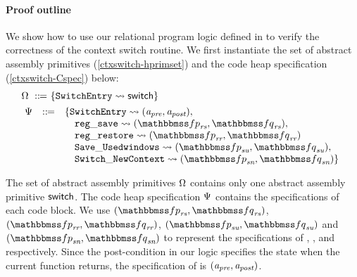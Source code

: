 \paragraph{\textbf{Proof outline}} We show how to use
our relational program logic defined in
\Fig{\ref{fig:Selected Inference Rules for Refinement Verification}}
to verify the correctness of the context switch routine.
We first instantiate the set of
abstract assembly primitives (\ref{ctxswitch-hprimset})
and the code heap specification (\ref{ctxswitch-Cspec})
below:
\begin{align}
    & \hprimset \ \define \ \{ \SwitchEntry \leadsto
        \primsw \}
        \label{ctxswitch-hprimset} \\
    & \!\begin{array}{lcl}
        \Cspec & \define &
        \{ \SwitchEntry \leadsto (\Apre, \Apost), \\
        & & \quad
        \regsave \leadsto
        (\relspecpre_{\textit{rs}}, \relspecpost_{\textit{rs}}),\\
        & & \quad
        \regrestore \leadsto
        (\relspecpre_{\textit{rr}}, \relspecpost_{\textit{rr}}) \\
        & & \quad
        \SaveUsedWin{} \leadsto (\relspecpre_{\textit{su}}, \relspecpost_{\textit{su}}), \\
        & & \quad
        \SwitchNewTask{} \leadsto (\relspecpre_{\textit{sn}}, \relspecpost_{\textit{sn}})
        \}
        \label{ctxswitch-Cspec}
    \end{array}
\end{align}

The set of abstract assembly primitives $\Omega$
contains only one abstract assembly primitive $\mathsf{switch}$.
The code heap specification $\Psi{}$
contains the specifications of each code block.
We use
$(\relspecpre_{\textit{rs}}, \relspecpost_{\textit{rs}})$,
$(\relspecpre_{\textit{rr}}, \relspecpost_{\textit{rr}})$,
$(\relspecpre_{\textit{su}}, \relspecpost_{\textit{su}})$ and
$(\relspecpre_{\textit{sn}}, \relspecpost_{\textit{sn}})$
to represent the specifications of
\regsave{}, \regrestore{},
\SaveUsedWin{} and \SwitchNewTask{} respectively.
Since the post-condition in our logic specifies the
state when the current function returns,
the specification of \SwitchEntry{} is $(\textit{a}_\textit{pre}, \textit{a}_\textit{post})$.

